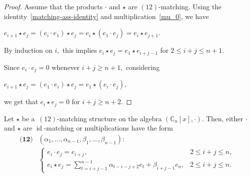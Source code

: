 \documentclass{jonasart}
\DeclareMathOperator{\id}{id}
\begin{document}
	\begin{proof}
		Assume that the products $\cdot$ and $\star$ are $(12)$-matching. Using the identity~\eqref{matching-ass-identity} and multiplication~\eqref{mu_0}, we have
		\begin{center}
			$e_{i+1} \star e_j =(e_i \cdot e_1 )\star e_j = e_i \star (e_1\cdot e_j )=e_i \star e_{j+1}.$
		\end{center}
		By induction on $i,$ this implies $e_{i} \star e_j = e_1 \star e_{i+j-1}$ for $2\leq i+j \leq n+1.$

		Since $e_{i} \cdot e_j =0$ whenever $ i+j \geq n+1,$ considering
		\begin{center}
			$e_{i+1}\star e_j = (e_1 \cdot e_{i})\star e_j = e_1 \star (e_{i} \cdot e_j ),$
		\end{center}
		we get that $e_{i} \star e_j =0$ for $i+j \geq n+2.$
	\end{proof}

	\begin{theorem}\label{th15}
		Let $ \star$ be a~$(12)$-matching structure on the algebra $(\mathbb{C}_n [x], \cdot)$. Then, either $\cdot$ and $\star$ are $\id$-matching or multiplications have the form
		\begin{align*}
			\textbf{(12)}&(\alpha_1,\dots, \alpha_{n-1}, \beta_1,\dots, \beta_{n-1}): \\
			&\begin{cases}
				e_i \cdot e_j =e_{i+j}, & 2\leq i+j \leq n, \\[1mm]
				e_i \star e_j = \sum_{t=i+j-1}^{n-1}\alpha_{t-i-j+2}e_t +\beta_{i+j-1} e_n, & 2\leq i+j \leq n.
			\end{cases}
		\end{align*}
	\end{theorem}
\end{document}
